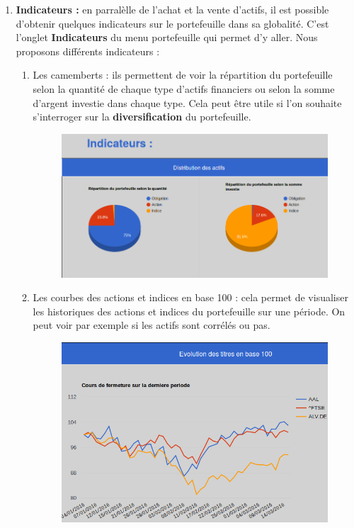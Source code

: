 \begin{enumerate}
      \item \textbf{Indicateurs :} en parralèlle de l'achat et la vente d'actifs, il est possible d'obtenir quelques indicateurs sur le portefeuille dans sa globalité. C'est l'onglet \textbf{Indicateurs} du menu portefeuille qui permet d'y aller. Nous proposons différents indicateurs :
      \begin{enumerate}
       \item Les camemberts : ils permettent de voir la répartition du portefeuille selon la quantité de chaque type d'actifs financiers ou selon la somme d'argent investie dans chaque type. Cela peut être utile si l'on souhaite s'interroger sur la \textbf{diversification} du portefeuille.
	  \begin{figure}[H]
	    \center
	    \includegraphics[scale=0.5]{../graph/7-indicateursPtfcamemberts.png}
	  \end{figure}
	  
       \item Les courbes des actions et indices en base 100 : cela permet de visualiser les historiques des actions et indices du portefeuille sur une période. On peut voir par exemple si les actifs sont corrélés ou pas.
	  \begin{figure}[H]
	    \center
	    \includegraphics[scale=0.5]{../graph/7-indicateursbase100.png}
	  \end{figure}
      

\end{enumerate}
\end{enumerate}
